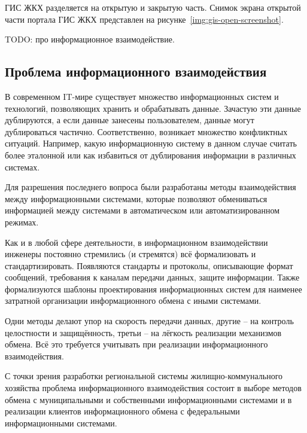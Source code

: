 ГИС ЖКХ разделяется на открытую и закрытую часть.
Снимок экрана открытой части портала ГИС ЖКХ представлен на рисунке~\ref{img:gis-open-screenshot}.


TODO: про информационное взаимодействие.

\subsection{Проблема информационного взаимодействия}


В современном IT-мире существует множество информационных систем и технологий, позволяющих хранить и обрабатывать данные.
Зачастую эти данные дублируются, а если данные занесены пользователем, данные могут дублироваться частично.
Соответственно, возникает множество конфликтных ситуаций.
Например, какую информационную систему в данном случае считать более эталонной или как избавиться от дублирования информации в различных системах.

Для разрешения последнего вопроса были разработаны методы взаимодействия между информационными системами, которые позволяют обмениваться информацией между системами в автоматическом или автоматизированном режимах.

Как и в любой сфере деятельности, в информационном взаимодействии инженеры постоянно стремились (и стремятся) всё формализовать и стандартизировать.
Появляются стандарты и протоколы, описывающие формат сообщений, требования к каналам передачи данных, защите информации.
Также формализуются шаблоны проектирования информационных систем для наименее затратной организации информационного обмена с иными системами.

Одни методы делают упор на скорость передачи данных, другие -- на контроль целостности и защищённость, третьи -- на лёгкость реализации механизмов обмена.
Всё это требуется учитывать при реализации информационного взаимодействия.

С точки зрения разработки региональной системы жилищно-коммунального хозяйства проблема информационного взаимодействия состоит в выборе методов обмена с муниципальными и собственными информационными системами и в реализации клиентов информационного обмена с федеральными информационными системами. 


